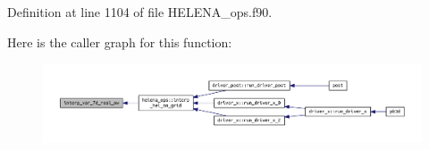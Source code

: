 Definition at line 1104 of file H\+E\+L\+E\+N\+A\+\_\+ops.\+f90.

Here is the caller graph for this function\+:
\nopagebreak
\begin{figure}[H]
\begin{center}
\leavevmode
\includegraphics[width=350pt]{HELENA__ops_8f90_a8229f4b89831a39793047106375555cf_icgraph}
\end{center}
\end{figure}

